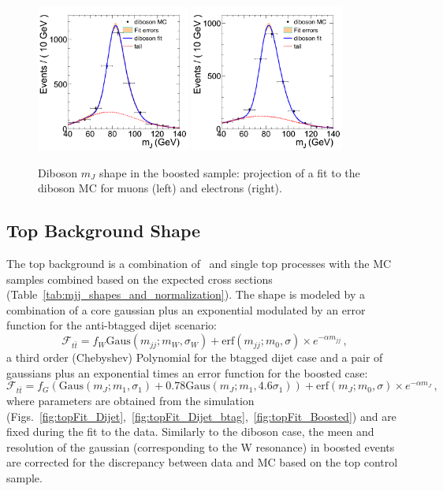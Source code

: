 \begin{figure}
\begin{center}
\includegraphics[width=0.45\textwidth]{figs/wpj/DibosonBoostedlnuJ_diboson_muon_2jets.png}
\includegraphics[width=0.45\textwidth]{figs/wpj/DibosonBoostedlnuJ_diboson_electron_2jets.png}
\end{center}
\caption{Diboson $m_{J}$ shape in the boosted sample: projection of a fit to the diboson MC for muons (left) and electrons (right).}
\label{fig:dibosonFit_Boosted}
\end{figure}


\subsection{Top Background Shape}
The top background is a combination of \ttbar\ and single top processes with the MC samples combined based on the expected cross sections (Table~\ref{tab:mjj_shapes_and_normalization}). The shape is modeled by a combination of a core gaussian plus an exponential modulated by an error function for the anti-btagged dijet scenario:
\begin{equation}
  \mathcal{F}_{t\bar{t}} = f_{W}\text{Gaus}(m_{jj}; m_{W}, \sigma_{W})+\text{erf}(m_{jj}; m_0, \sigma)\times e^{-\alpha m_{jj}}\,,
\end{equation}
a third order (Chebyshev) Polynomial for the btagged dijet case and a pair of gaussians plus an exponential times an error function for the boosted case:
\begin{equation}
  \mathcal{F}_{t\bar{t}} = f_{G}(\text{Gaus}(m_{J}; m_{1}, \sigma_{1})+0.78\text{Gaus}(m_{J}; m_{1}, 4.6\sigma_{1}))+\text{erf}(m_{J}; m_0, \sigma)\times e^{-\alpha m_{J}}\,,
\end{equation}
where parameters are obtained from the simulation (Figs.~\ref{fig:topFit_Dijet},~\ref{fig:topFit_Dijet_btag},~\ref{fig:topFit_Boosted}) and are fixed during the fit to the data. Similarly to the diboson case, the meen and resolution of the gaussian (corresponding to the W resonance) in boosted events are corrected for the discrepancy between data and MC based on the top control sample. 

